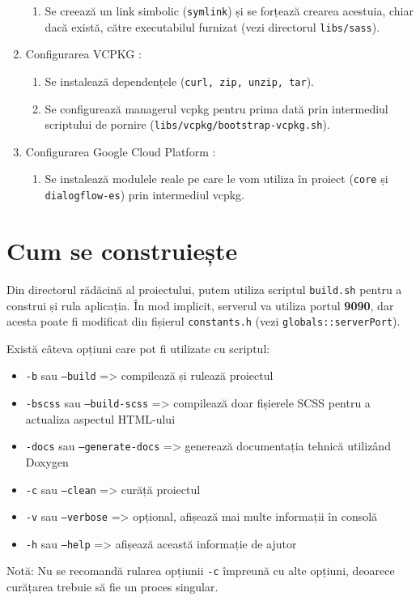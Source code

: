\begin{enumerate}
\begin{enumerate}
      \item Se creează un link simbolic (\texttt{symlink}) și se forțează crearea acestuia, chiar dacă există, către executabilul furnizat (vezi directorul \texttt{libs/sass}).
    \end{enumerate}
  \item Configurarea VCPKG \cite{vcpkg}:
    \begin{enumerate}
      \item Se instalează dependențele (\texttt{curl, zip, unzip, tar}).
      \item Se configurează managerul vcpkg pentru prima dată prin intermediul scriptului de pornire (\texttt{libs/vcpkg/bootstrap-vcpkg.sh}).
    \end{enumerate}
  \item Configurarea Google Cloud Platform \cite{dialogflow_quickstart}:
    \begin{enumerate}
      \item Se instalează modulele reale pe care le vom utiliza în proiect (\texttt{core} și \texttt{dialogflow-es}) prin intermediul vcpkg.
    \end{enumerate}
\end{enumerate}

\section{Cum se construiește}
Din directorul rădăcină al proiectului, putem utiliza scriptul \texttt{build.sh} pentru a construi și rula aplicația. În mod implicit, serverul va utiliza portul \textbf{9090}, dar acesta poate fi modificat din fișierul \texttt{constants.h} (vezi \texttt{globals::serverPort}).

Există câteva opțiuni care pot fi utilizate cu scriptul:
\begin{itemize}
  \item \texttt{-b} sau \texttt{--build} => compilează și rulează proiectul
  \item \texttt{-bscss} sau \texttt{--build-scss} => compilează doar fișierele SCSS pentru a actualiza aspectul HTML-ului
  \item \texttt{-docs} sau \texttt{--generate-docs} => generează documentația tehnică utilizând Doxygen
  \item \texttt{-c} sau \texttt{--clean} => curăță proiectul
  \item \texttt{-v} sau \texttt{--verbose} => opțional, afișează mai multe informații în consolă
  \item \texttt{-h} sau \texttt{--help} => afișează această informație de ajutor
\end{itemize}

Notă: Nu se recomandă rularea opțiunii \texttt{-c} împreună cu alte opțiuni, deoarece curățarea trebuie să fie un proces singular.